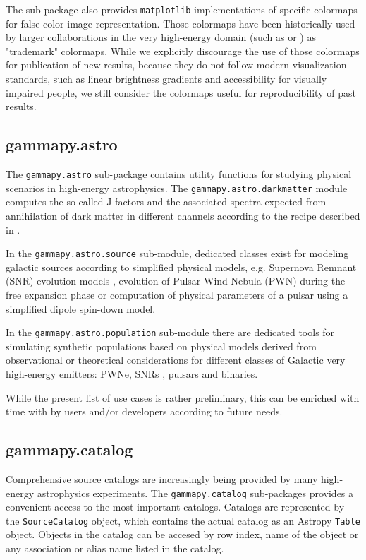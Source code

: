\documentclass[traditabstract, longauth]{aa}
\newcommand{\code}[1]{\texttt{#1}}
\begin{document}
The sub-package also provides \texttt{matplotlib} implementations of specific
colormaps for false color image representation. Those colormaps have
been historically used by larger collaborations in the very high-energy
domain (such as \milagro or \hess) as "trademark" colormaps.
While we explicitly discourage the use of those colormaps for publication
of new results, because they do not follow modern visualization
standards, such as linear brightness gradients and accessibility
for visually impaired people, we still consider the colormaps
useful for reproducibility of past results.

\subsection{gammapy.astro}
\label{ssec:gammapy-astro}
The \code{gammapy.astro} sub-package contains utility functions for studying physical
scenarios in high-energy astrophysics. The \code{gammapy.astro.darkmatter} module
computes the so called J-factors and the associated \gammaray spectra expected
from annihilation of dark matter in different channels according to the recipe
described in \cite{2011JCAP...03..051C}.

In the \code{gammapy.astro.source} sub-module, dedicated classes exist for modeling
galactic \gammaray sources according to simplified physical models, e.g. Supernova Remnant (SNR) evolution
models \citep{1950RSPSA.201..159T, 1999ApJS..120..299T}, evolution of Pulsar Wind Nebula (PWN) during the
free expansion phase \citep{2006ARA&A..44...17G} or computation
of physical parameters of a pulsar using a simplified dipole spin-down model.

In the \code{gammapy.astro.population} sub-module there are dedicated tools
for simulating synthetic populations based on physical models derived from
observational or theoretical considerations for different classes of Galactic
very high-energy \gammaray emitters: PWNe, SNRs \cite{1998ApJ...504..761C},
pulsars \cite{2006ApJ...643..332F, 2006MNRAS.372..777L, 2004A&A...422..545Y}
and \gammaray binaries.

While the present list of use cases is rather preliminary, this can be enriched
with time with by users and/or developers according to future needs.

\subsection{gammapy.catalog}
\label{ssec:gammapy-catalog}
Comprehensive source catalogs are increasingly being provided by many high-energy
 astrophysics experiments. The \code{gammapy.catalog} sub-packages
provides a convenient access to the most important \gammaray catalogs.
Catalogs are represented by the \code{SourceCatalog} object, which
contains the actual catalog as an Astropy \code{Table} object.
Objects in the catalog can be accesed by row index, name of the
object or any association or alias name listed in the catalog.
\end{document}
